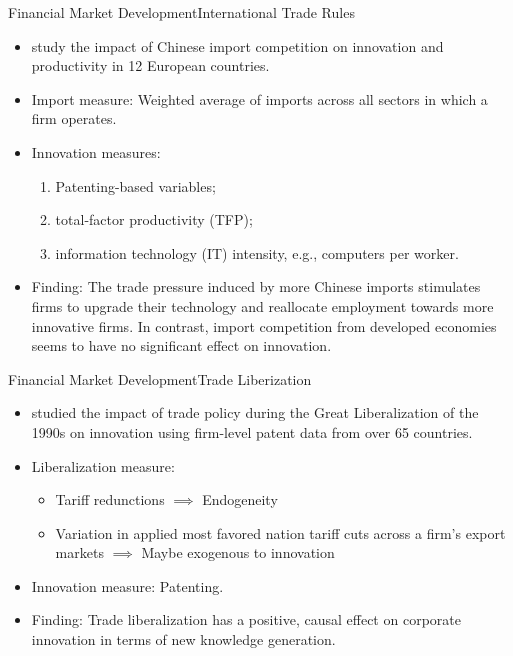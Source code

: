 \documentclass{beamer}
\begin{document}
    \begin{frame}{Financial Market Development}{International Trade Rules}
        \begin{itemize}
            \item \citet{BDV2016TradeInducedTechnical} study the impact of Chinese import competition on innovation and productivity in 12 European countries.
            \item Import measure: Weighted average of imports across all sectors in which a firm operates.
            \item Innovation measures: 
            \begin{enumerate}
                \item Patenting-based variables;
                \item total-factor productivity (TFP);
                \item information technology (IT) intensity, e.g., computers per worker.
            \end{enumerate}
            \item Finding: The trade pressure induced by more Chinese imports stimulates firms to upgrade their technology and reallocate employment towards more innovative firms. In contrast, import competition from developed economies seems to have no significant effect on innovation.
        \end{itemize}
    \end{frame}

    \begin{frame}{Financial Market Development}{Trade Liberization}
        \vspace{-1cm}
        \begin{itemize}
            \item \citet{CMU2022BetterFasterStronger} studied the impact of trade policy during the Great Liberalization of the 1990s on innovation using firm-level patent data from over 65 countries.
            \item Liberalization measure: 
            \begin{itemize}
              \item Tariff redunctions $\implies$ Endogeneity
              \item Variation in applied most favored nation tariff cuts across a firm’s export markets $\implies$ Maybe exogenous to innovation
            \end{itemize}
            \item Innovation measure: Patenting.
            \item Finding: Trade liberalization has a positive, causal effect on corporate innovation in terms of new knowledge generation.
        \end{itemize}
    \end{frame}
\end{document}
